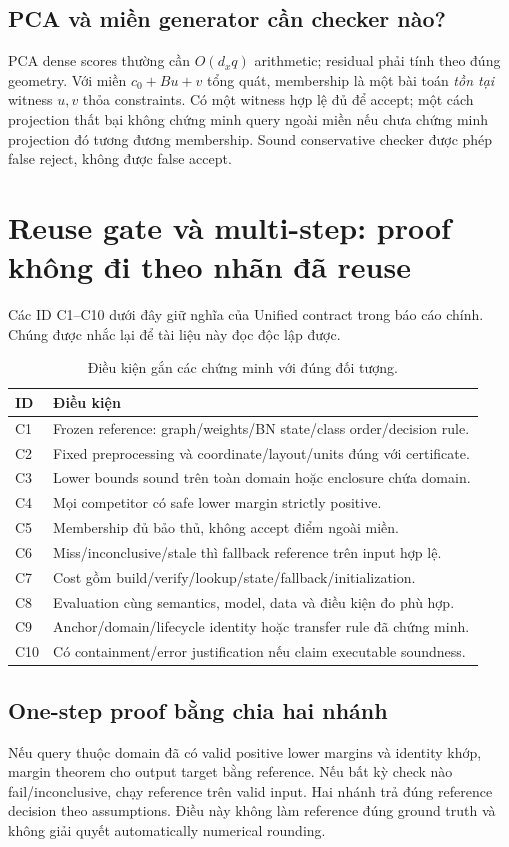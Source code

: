 \documentclass[11pt,a4paper]{article}
\theoremstyle{definition}
\begin{document}
\subsection{PCA và miền generator cần checker nào?}
PCA dense scores thường cần $O(d_xq)$ arithmetic; residual phải tính theo
đúng geometry. Với miền $c_0+Bu+v$ tổng quát, membership là một bài toán
\emph{tồn tại} witness $u,v$ thỏa constraints. Có một witness hợp lệ đủ
để accept; một cách projection thất bại không chứng minh query ngoài miền
nếu chưa chứng minh projection đó tương đương membership. Sound conservative
checker được phép false reject, không được false accept.

\section{Reuse gate và multi-step: proof không đi theo nhãn đã reuse}
Các ID C1--C10 dưới đây giữ nghĩa của Unified contract trong báo cáo chính.
Chúng được nhắc lại để tài liệu này đọc độc lập được.
\begin{table}[!htbp]\centering\small
\caption{Điều kiện gắn các chứng minh với đúng đối tượng.}
\begin{tabularx}{\linewidth}{@{}p{1cm}Y@{}}\toprule
ID & Điều kiện\\\midrule
C1 & Frozen reference: graph/weights/BN state/class order/decision rule.\\
C2 & Fixed preprocessing và coordinate/layout/units đúng với certificate.\\
C3 & Lower bounds sound trên toàn domain hoặc enclosure chứa domain.\\
C4 & Mọi competitor có safe lower margin strictly positive.\\
C5 & Membership đủ bảo thủ, không accept điểm ngoài miền.\\
C6 & Miss/inconclusive/stale thì fallback reference trên input hợp lệ.\\
C7 & Cost gồm build/verify/lookup/state/fallback/initialization.\\
C8 & Evaluation cùng semantics, model, data và điều kiện đo phù hợp.\\
C9 & Anchor/domain/lifecycle identity hoặc transfer rule đã chứng minh.\\
C10 & Có containment/error justification nếu claim executable soundness.\\\bottomrule
\end{tabularx}
\end{table}
\subsection{One-step proof bằng chia hai nhánh}
Nếu query thuộc domain đã có valid positive lower margins và identity
khớp, margin theorem cho output target bằng reference. Nếu bất kỳ check
nào fail/inconclusive, chạy reference trên valid input. Hai nhánh trả đúng
reference decision theo assumptions. Điều này không làm reference đúng
ground truth và không giải quyết automatically numerical rounding.
\end{document}
